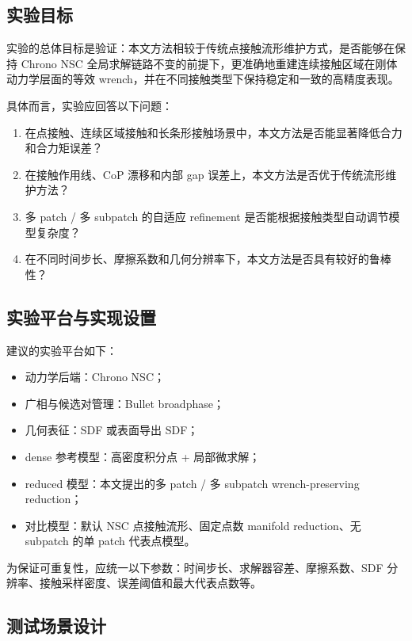 \documentclass[UTF8,a4paper,11pt]{ctexart}
\begin{document}
\subsection{实验目标}

实验的总体目标是验证：本文方法相较于传统点接触流形维护方式，是否能够在保持 Chrono NSC 全局求解链路不变的前提下，更准确地重建连续接触区域在刚体动力学层面的等效 wrench，并在不同接触类型下保持稳定和一致的高精度表现。

具体而言，实验应回答以下问题：
\begin{enumerate}[label=(\arabic*)]
    \item 在点接触、连续区域接触和长条形接触场景中，本文方法是否能显著降低合力和合力矩误差？
    \item 在接触作用线、CoP 漂移和内部 gap 误差上，本文方法是否优于传统流形维护方法？
    \item 多 patch / 多 subpatch 的自适应 refinement 是否能根据接触类型自动调节模型复杂度？
    \item 在不同时间步长、摩擦系数和几何分辨率下，本文方法是否具有较好的鲁棒性？
\end{enumerate}

\subsection{实验平台与实现设置}

建议的实验平台如下：
\begin{itemize}[leftmargin=2em]
    \item 动力学后端：Chrono NSC；
    \item 广相与候选对管理：Bullet broadphase；
    \item 几何表征：SDF 或表面导出 SDF；
    \item dense 参考模型：高密度积分点 + 局部微求解；
    \item reduced 模型：本文提出的多 patch / 多 subpatch wrench-preserving reduction；
    \item 对比模型：默认 NSC 点接触流形、固定点数 manifold reduction、无 subpatch 的单 patch 代表点模型。
\end{itemize}

为保证可重复性，应统一以下参数：时间步长、求解器容差、摩擦系数、SDF 分辨率、接触采样密度、误差阈值和最大代表点数等。

\subsection{测试场景设计}
\end{document}
